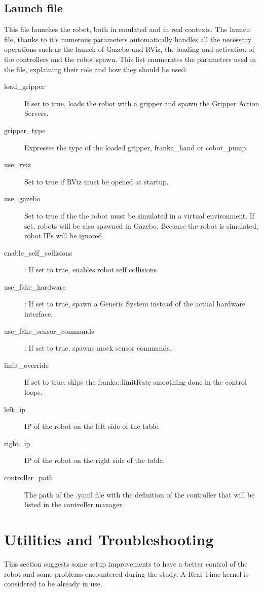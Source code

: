 \documentclass{article}
\begin{document}
\subsection{Launch file}
This file launches the robot, both in emulated and in real contexts. The launch file, thanks to it's numerous parameters automatically handles all the necessary operations such as the launch of Gazebo and RViz, the loading and activation of the controllers and the robot spawn. This list enumerates the parameters used in the file, explaining their role and how they should be used:
\begin{description}
    \item[load\_gripper] If set to true, loads the robot with a gripper and spawn the Gripper Action Servers.
    \item[gripper\_type] Expresses the type of the loaded gripper, franka\_hand or cobot\_pump.
    \item[use\_rviz] Set to true if RViz must be opened at startup.
    \item[use\_gazebo] Set to true if the the robot must be simulated in a virtual environment. If set, robots will be also spawned in Gazebo. Because the robot is simulated, robot IPs will be ignored.
    \item[enable\_self\_collisions]: If set to true, enables robot self collisions.
    \item[use\_fake\_hardware]: If set to true, spawn a Generic System instead of the actual hardware interface.
    \item[use\_fake\_sensor\_commands]: If set to true, spawns mock sensor commands.
    \item[limit\_override] If set to true, skips the franka::limitRate smoothing done in the control loops.
    \item[left\_ip] IP of the robot on the left side of the table.
    \item[right\_ip] IP of the robot on the right side of the table.
    \item[controller\_path] The path of the .yaml file with the definition of the controller that will be listed in the controller manager.
\end{description}

\section{Utilities and Troubleshooting}
This section suggests some setup improvements to have a better control of the robot and some problems encountered during the study.
A Real-Time kernel is considered to be already in use.
\end{document}
